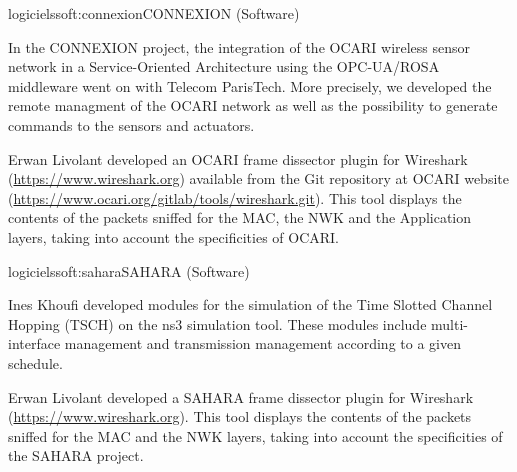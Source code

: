 \documentclass{ra2016}
\begin{document}
\begin{module}{logiciels}{soft:connexion}{CONNEXION (Software)} 

\begin{participants}
\end{participants}

In the CONNEXION project, the integration of the OCARI wireless sensor network
in a Service-Oriented Architecture using the OPC-UA/ROSA middleware went on with Telecom ParisTech. More precisely, we developed the remote managment of the OCARI network as well as the possibility to generate commands to the sensors and actuators. 

Erwan Livolant developed an OCARI frame dissector plugin for Wireshark (\url{https://www.wireshark.org}) available from the Git repository at OCARI website  (\url{https://www.ocari.org/gitlab/tools/wireshark.git}). This tool displays the contents of the packets sniffed for the MAC, the NWK and the Application layers, taking into account the specificities of OCARI.

\end{module}

\begin{module}{logiciels}{soft:sahara}{SAHARA (Software)} 

\begin{participants}
\end{participants}

Ines Khoufi developed modules for the simulation of the Time Slotted Channel Hopping (TSCH) on the 
ns3 simulation tool. These modules include multi-interface management and transmission management according 
to a given schedule. 
 
Erwan Livolant developed a SAHARA frame dissector plugin for Wireshark (\url{https://www.wireshark.org}). This tool displays the contents of the packets sniffed for the MAC and the NWK layers, taking into account the specificities of the SAHARA project.

\end{module}
\end{document}
